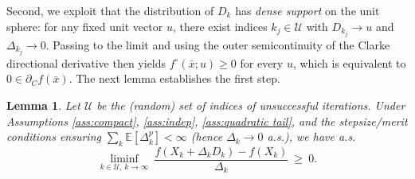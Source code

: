 \documentclass[11pt,a4paper]{article}
\newtheorem{lemma}{Lemma}[section]
\newcommand{\Dexp}{p}
\newcommand{\EE}{\mathbb{E}}
\begin{document}
Second, we exploit that the distribution of $D_k$ has \emph{dense support} on the unit sphere: for any fixed unit vector $u$, there exist indices $k_j\in \mathcal{U}$ with $D_{k_j}\to u$ and $\Delta_{k_j}\to 0$. Passing to the limit and using the outer semicontinuity of the Clarke directional derivative then yields $f^\circ(\bar x;u)\ge 0$ for every $u$, which is equivalent to $0\in\partial_C f(\bar x)$. The next lemma establishes the first step.
\begin{lemma}\label{lem:unsuccessful-dir-nonneg}
Let $\mathcal{U}$ be the (random) set of indices of unsuccessful iterations. Under
Assumptions \ref{ass:compact}, \ref{ass:indep}, \ref{ass:quadratic tail}, and the stepsize/merit
conditions ensuring $\sum_k \EE[\Delta_k^{\Dexp}]<\infty$ (hence $\Delta_k\to 0$ a.s.), we have a.s.
\[
\liminf_{k\in \mathcal{U},\,k\to\infty}\ \frac{f(X_k+\Delta_k D_k)-f(X_k)}{\Delta_k}\ \ge\ 0.
\]
\end{lemma}
\end{document}
